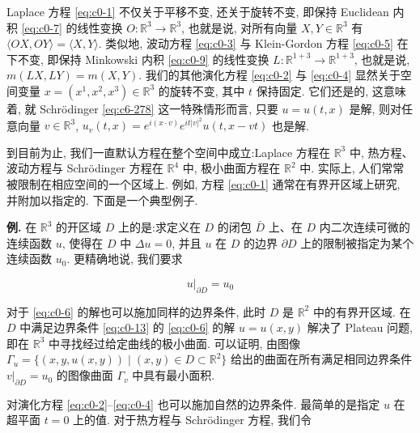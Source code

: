 Laplace 方程 \eqref{eq:c0-1} 不仅关于平移不变, 还关于旋转不变, 即保持 Euclidean 内积 \eqref{eq:c0-7} 的线性变换 $O : \mathbb{R}^{3} \to \mathbb{R}^{3}$, 也就是说, 对所有向量 $X, Y \in \mathbb{R}^{3}$ 有 $\langle O X, O Y \rangle = \langle X, Y \rangle$.
类似地, 波动方程 \eqref{eq:c0-3} 与 Klein-Gordon 方程 \eqref{eq:c0-5} 在下不变, 即保持 Minkowski 内积 \eqref{eq:c0-9} 的线性变换 $L : \mathbb{R}^{1+3} \to \mathbb{R}^{1+3}$, 也就是说, $m(L X, L Y) = m(X, Y)$.
我们的其他演化方程 \eqref{eq:c0-2} 与 \eqref{eq:c0-4} 显然关于空间变量 $x = (x^{1}, x^{2}, x^{3}) \in \mathbb{R}^{3}$ 的旋转不变, 其中 $t$ 保持固定.
它们还是的, 这意味着, 就 Schrödinger \eqref{eq:c6-278} 这一特殊情形而言, 只要 $u = u(t, x)$ 是解, 则对任意向量 $v \in \mathbb{R}^{3}$, $u_{v}(t, x) = e^{i (x \cdot v)} e^{i t |v|^{2}} u(t, x - v t)$ 也是解.

到目前为止, 我们一直默认方程在整个空间中成立:Laplace 方程在 $\mathbb{R}^{3}$ 中, 热方程、波动方程与 Schrödinger 方程在 $\mathbb{R}^{4}$ 中, 极小曲面方程在 $\mathbb{R}^{2}$ 中.
实际上, 人们常常被限制在相应空间的一个区域上.
例如, 方程 \eqref{eq:c0-1} 通常在有界开区域上研究, 并附加以指定的.
下面是一个典型例子.

\textbf{例.} 在 $\mathbb{R}^{3}$ 的开区域 $D$ 上的是:求定义在 $D$ 的闭包 $\bar{D}$ 上、在 $D$ 内二次连续可微的连续函数 $u$, 使得在 $D$ 中 $\Delta u = 0$, 并且 $u$ 在 $D$ 的边界 $\partial D$ 上的限制被指定为某个连续函数 $u_{0}$.
更精确地说, 我们要求

\begin{equation}\label{eq:c0-13}
u|_{\partial D} = u_{0}
\end{equation}

对于 \eqref{eq:c0-6} 的解也可以施加同样的边界条件, 此时 $D$ 是 $\mathbb{R}^{2}$ 中的有界开区域.
在 $D$ 中满足边界条件 \eqref{eq:c0-13} 的 \eqref{eq:c0-6} 的解 $u = u(x, y)$ 解决了 Plateau 问题, 即在 $\mathbb{R}^{3}$ 中寻找经过给定曲线的极小曲面.
可以证明, 由图像 $\Gamma_{u} = \{(x, y, u(x, y)) \mid (x, y) \in D \subset \mathbb{R}^{2}\}$ 给出的曲面在所有满足相同边界条件 $v|_{\partial D} = u_{0}$ 的图像曲面 $\Gamma_{v}$ 中具有最小面积.

对演化方程 \eqref{eq:c0-2}--\eqref{eq:c0-4} 也可以施加自然的边界条件.
最简单的是指定 $u$ 在超平面 $t = 0$ 上的值.
对于热方程与 Schrödinger 方程, 我们令

